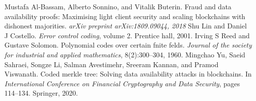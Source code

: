 \documentclass{report}
\begin{document}
\renewcommand{\bibname}{References}
\begin{thebibliography}{9}
	 Mustafa Al-Bassam, Alberto Sonnino, and Vitalik Buterin. Fraud and data availability proofs: Maximising light client security and scaling blockchains with dishonest majorities. \textit{arXiv preprint arXiv:1809.09044, 2018}
	 Shu Lin and Daniel J Costello. \textit{Error control coding}, volume 2. Prentice hall, 2001.
	 Irving S Reed and Gustave Solomon. Polynomial codes over certain fnite felds. \textit{Journal of the society for industrial and applied mathematics}, 8(2):300–304, 1960.
	 Mingchao Yu, Saeid Sahraei, Songze Li, Salman Avestimehr, Sreeram Kannan, and Pramod Viswanath. Coded merkle tree: Solving data availability attacks in blockchains. In \textit{International Conference on Financial Cryptography and Data Security}, pages 114–134. Springer, 2020.
\end{thebibliography}
\end{document}
